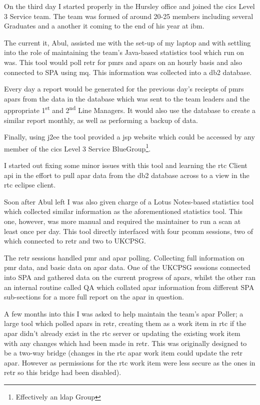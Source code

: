 \documentclass[a4paper,11pt]{report}
\begin{document}
On the third day I started properly in the Hursley office and joined the \gls{cics} Level 3 Service
team. The team was formed of around 20-25 members including several Graduates and a another 
\gls{it} coming to the end of his year at \gls{ibm}.

The current \gls{it}, Abul, assisted me with the set-up of my laptop and with settling into the 
role of maintaining the team's Java-based statistics tool which run on \gls{was}. This tool would 
poll \gls{retr} for \gls{pmr}s and \gls{apar}s on an hourly basis and also connected to SPA using 
\gls{mq}. This information was collected into a \gls{db2} database.

Every day a report would be generated for the previous day's reciepts of \gls{pmr}s \gls{apar}s 
from the data in the database which was sent to the team leaders and the appropriate 
1\textsuperscript{st} and 2\textsuperscript{nd} Line Managers. It would also use the database to
create a similar report monthly, as well as performing a backup of data.

Finally, using \gls{j2ee} the tool provided a \gls{jsp} website which could be accessed by any 
member of the \gls{cics} Level 3 Service BlueGroup\footnote{Effectively an \gls{ldap} Group}.

I started out fixing some minor issues with this tool and learning the \gls{rtc} Client \gls{api}
in the effort to pull \gls{apar} data from the \gls{db2} database across to a view in the \gls{rtc}
eclipse client.

Soon after Abul left I was also given charge of a Lotus Notes-based statistics tool which collected
similar information as the aforementioned statistics tool. This one, however, was more manual and
required the maintainer to run a scan at least once per day. This tool directly interfaced with 
four \gls{pcomm} sessions, two of which connected to \gls{retr} and two to UKCPSG.

The \gls{retr} sessions handled \gls{pmr} and \gls{apar} polling. Collecting full information on
\gls{pmr} data, and basic data on \gls{apar} data. One of the UKCPSG sessions connected into SPA 
and gathered data on the current progress of \gls{apar}s, whilst the other ran an internal routine 
called QA which collated \gls{apar} information from different SPA sub-sections for a more full
report on the \gls{apar} in question.

A few months into this I was asked to help maintain the team's \gls{apar} Poller; a large tool 
which polled \gls{apar}s in \gls{retr}, creating them as a work item in \gls{rtc} if the \gls{apar}
didn't already exist in the \gls{rtc} server or updating the existing work item with any changes
which had been made in \gls{retr}. This was originally designed to be a two-way bridge (changes in
the \gls{rtc} \gls{apar} work item could update the \gls{retr} \gls{apar}. However as permissions
for the \gls{rtc} work item were less secure as the ones in \gls{retr} so this bridge had been 
disabled).
\end{document}
